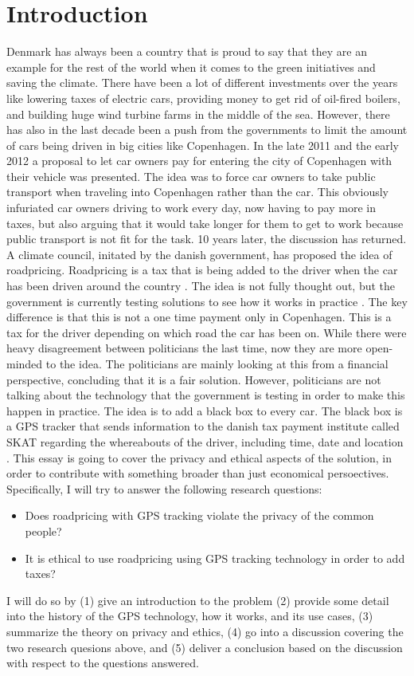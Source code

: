 \section{Introduction}
Denmark has always been a country that is proud to say that they are an example for the rest of the world when it comes to the green initiatives and saving the climate. There have been a lot of different investments over the years like lowering taxes of electric cars, providing money to get rid of oil-fired boilers, and building huge wind turbine farms in the middle of the sea. However, there has also in the last decade been a push from the governments to limit the amount of cars being driven in big cities like Copenhagen. In the late 2011 and the early 2012 a proposal to let car owners pay for entering the city of Copenhagen with their vehicle was presented. The idea was to force car owners to take public transport when traveling into Copenhagen rather than the car. This obviously infuriated car owners driving to work every day, now having to pay more in taxes, but also arguing that it would take longer for them to get to work because public transport is not fit for the task. 10 years later, the discussion has returned. A climate council, initated by the danish government, has proposed the idea of roadpricing. Roadpricing is a tax that is being added to the driver when the car has been driven around the country \cite{borsen:2013}. The idea is not fully thought out, but the government is currently testing solutions to see how it works in practice \cite{kosmopol:2022}. The key difference is that this is not a one time payment only in Copenhagen. This is a tax for the driver depending on which road the car has been on. While there were heavy disagreement between politicians the last time, now they are more open-minded to the idea. The politicians are mainly looking at this from a financial perspective, concluding that it is a fair solution. However, politicians are not talking about the technology that the government is testing in order to make this happen in practice. The idea is to add a black box to every car. The black box is a GPS tracker that sends information to the danish tax payment institute called SKAT regarding the whereabouts of the driver, including time, date and location \cite{jylland:2011}.
This essay is going to cover the privacy and ethical aspects of the solution, in order to contribute with something broader than just economical persoectives. Specifically, I will try to answer the following research questions:
\begin{itemize}
    \item Does roadpricing with GPS tracking violate the privacy of the common people?
    \item It is ethical to use roadpricing using GPS tracking technology in order to add taxes?
\end{itemize}
I will do so by (1) give an introduction to the problem (2) provide some detail into the history of the GPS technology, how it works, and its use cases, (3) summarize the theory on privacy and ethics, (4) go into a discussion covering the two research quesions above, and (5) deliver a conclusion based on the discussion with respect to the questions answered.